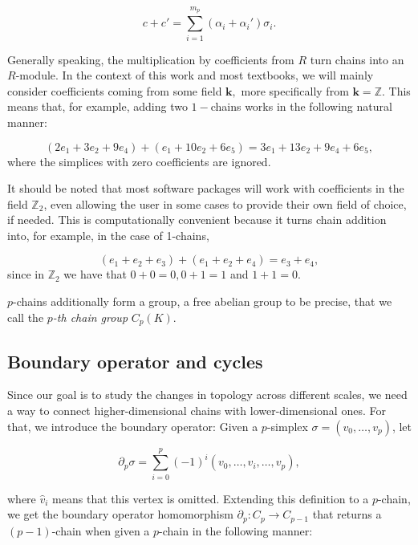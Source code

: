 \begin{equation*}
  c + c' = \sum_{i=1}^{m_{p}} (\alpha_{i} + \alpha_{i}')\sigma_{i}.
\end{equation*}

Generally speaking, the multiplication by coefficients from $R$ turn chains into an $R$-module. In the context of this work and most textbooks, we will mainly consider coefficients coming from some field $\boldsymbol{k},$ more specifically from $\boldsymbol{k} = \mathbb{Z}$. This means that, for example, adding two $1-$chains works in the following natural manner:

\begin{equation*}
  (2e_{1} + 3e_{2} + 9e_{4}) + (e_{1} + 10e_{2} + 6e_{5}) = 3e_{1} + 13e_{2} + 9e_{4} + 6e_{5},
\end{equation*}
where the simplices with zero coefficients are ignored.

It should be noted that most software packages will work with coefficients in the field $\mathbb{Z}_{2}$, even allowing the user in some cases to provide their own field of choice, if needed. This is computationally convenient because it turns chain addition into, for example, in the case of 1-chains,

\begin{equation*}
  (e_{1} + e_{2} + e_{3}) + (e_{1} + e_{2} + e_{4}) = e_{3} + e_{4},
\end{equation*}
\noindent
since in $\mathbb{Z}_{2}$ we have that $0 + 0 = 0, 0 + 1 = 1$ and $1+1 = 0$.

$p$-chains additionally form a group, a free abelian group to be precise, that we call the \textit{$p$-th chain group} $C_{p}(K)$.

\subsection{Boundary operator and cycles}
Since our goal is to study the changes in topology across different scales, we need a way to connect higher-dimensional chains with lower-dimensional ones. For that, we introduce the boundary operator: Given a $p$-simplex $\sigma = (v_{0}, \ldots, v_{p})$, let

\begin{equation*}
  \partial_{p}\sigma = \sum_{i=0}^{p}(-1)^{i}(v_{0}, \ldots, \hat{v}_{i}, \ldots, v_{p}),
\end{equation*}

\noindent
where $\hat{v}_{i}$ means that this vertex is omitted. Extending this definition to a $p$-chain, we get the boundary operator homomorphism $\partial_{p}: C_{p} \to C_{p-1}$ that returns a $(p-1)$-chain when given a $p$-chain in the following manner:

